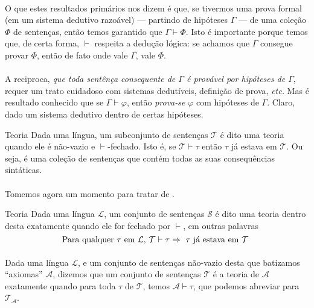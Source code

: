         \paragraph{}
            O que estes resultados primários nos dizem é que, se tivermos uma prova formal 
            (em um sistema dedutivo razoável)
            --- partindo de hipóteses $\Gamma$ --- de uma coleção $\Phi$ de sentenças, 
            então temos garantido que $\Gamma\vdash\Phi$. Isto é importante porque temos 
            que, de certa forma, $\vdash$ respeita a dedução lógica: se achamos que 
            $\Gamma$ consegue provar $\Phi$, então de fato onde vale $\Gamma$, vale $\Phi$.
        \paragraph{}
            A reciproca, {\emph{que toda sentênça consequente de $\Gamma$ é provável por 
            hipóteses de $\Gamma$}}, requer um trato cuidadoso com sistemas dedutíveis, 
            definição de prova, {\emph{etc.}} Mas é resultado conhecido que se $\Gamma\vdash\varphi$,
            então {\emph{prova-se}} $\varphi$ com hipóteses de $\Gamma$. Claro, dado um 
            sistema dedutivo dentro de certas hipóteses.
            \begin{definition}{Teoria}
                Dada uma língua, um subconjunto de sentenças $\mathcal{T}$ é dito uma teoria
                quando ele é não-vazio e $\vdash$-fechado. Isto é, se $\mathcal{T}\vdash\tau$ 
                então $\tau$ já estava em $\mathcal{T}$. Ou seja, é uma coleção de sentenças 
                que contém todas as suas consequências sintáticas.
        \end{definition}
        \paragraph{}
            Tomemos agora um momento para tratar de .
        \begin{definition}{Teoria}
            Dada uma língua $\mathcal{L}$, um conjunto de sentenças $\mathcal{S}$ é dito uma teoria
            dentro desta exatamente quando ele for fechado por $\vdash$, em outras palavras
            $$\text{Para qualquer $\tau$ em $\mathcal{L}$, }\mathcal{T}\vdash\tau\Rightarrow\text{ $\tau$ já estava em $\mathcal{T}$ }$$
        \end{definition}
        \paragraph{}
            \newcommand{\theoryof}[1]{\mathcal{T}_{#1}}
            Dada uma língua $\mathcal{L}$, e um conjunto de sentenças não-vazio desta que batizamos ``axiomas'' 
            $\mathcal{A}$, dizemos que um conjunto de sentenças $\mathcal{T}$ é a teoria de 
            $\mathcal{A}$ exatamente quando para toda $\tau$ de $\mathcal{T}$, temos 
            $\mathcal{A}\vdash\tau$, que podemos abreviar para $\theoryof{\mathcal{A}}$.
